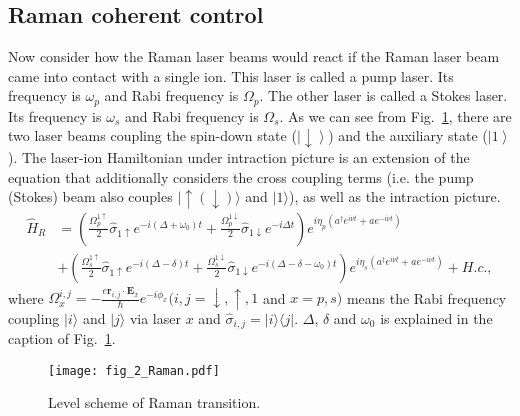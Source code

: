 \subsection{Raman coherent control}

Now consider how the Raman laser beams would react if the Raman laser beam came into contact with a single ion. This laser is called a pump laser. Its frequency is $\omega_p$ and Rabi frequency is $\Omega_p$. The other laser is called a Stokes laser. Its frequency is $\omega_s$ and Rabi frequency is $\Omega_s$. As we can see from Fig.~\ref{fig:Raman}, there are two laser beams coupling the spin-down state ($\left|\downarrow\right\rangle$) and the auxiliary state ($\left|1\right\rangle$). The laser-ion Hamiltonian under intraction picture is an extension of the equation that additionally considers the cross coupling terms (i.e. the pump (Stokes) beam also couples $|\uparrow(\downarrow)\rangle$ and $|1\rangle$), as well as the intraction picture.
\begin{equation}
    \begin{aligned}
        \label{Raman interaction H}
        \hat{H}_{R} & =\left(\frac{\Omega_p^{1\uparrow}}{2}\hat{\sigma}_{1\uparrow}e^{-i(\Delta+\omega_0)t}+\frac{\Omega_p^{1\downarrow}}{2}\hat{\sigma}_{1\downarrow}e^{-i\Delta t}\right)e^{i\eta_p(a^\dag e^{i\nu t}+ae^{-i\nu t})} \\&+\left(\frac{\Omega_s^{1\uparrow}}{2}\hat{\sigma}_{1\uparrow}e^{-i(\Delta-\delta)t}+\frac{\Omega_s^{1\downarrow}}{2}\hat{\sigma}_{1\downarrow}e^{-i(\Delta-\delta-\omega_0) t}\right)e^{i\eta_s(a^\dag e^{i\nu t}+ae^{-i\nu t})}+H.c.,
    \end{aligned}
\end{equation}
where $\Omega_x^{i, j}=-\frac{e \mathbf{r}_{i, j} \cdot \mathbf{E}_x}{\hbar} e^{-i \phi_x}(i, j=\downarrow, \uparrow, 1$ and $x=p, s)$ means the Rabi frequency coupling $|i\rangle$ and $|j\rangle$ via laser $x$ and $\hat{\sigma}_{i, j}=|i\rangle\langle j|$. $\Delta$, $\delta$ and $\omega_0$ is explained in the caption of Fig.~\ref{fig:Raman}.

\begin{figure}
    \centering
    \texttt{[image: fig\_2\_Raman.pdf]}
    \caption{Level scheme of Raman transition.}
    \label{fig:Raman}
\end{figure}

